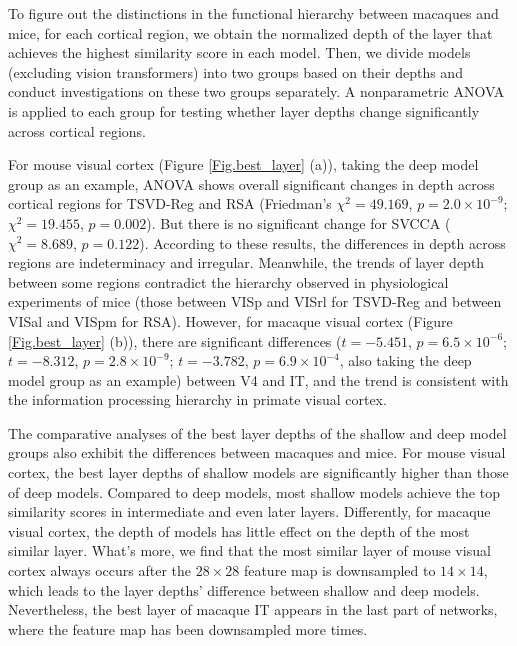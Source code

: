 \documentclass[letterpaper]{article} %
\begin{document}
To figure out the distinctions in the functional hierarchy between macaques and mice, for each cortical region, we obtain the normalized depth of the layer that achieves the highest similarity score in each model. Then, we divide models (excluding vision transformers) into two groups based on their depths and conduct investigations on these two groups separately. A nonparametric ANOVA is applied to each group for testing whether layer depths change significantly across cortical regions.

For mouse visual cortex (Figure \ref{Fig.best_layer} (a)), taking the deep model group as an example, ANOVA shows overall significant changes in depth across cortical regions for TSVD-Reg and RSA (Friedman's ${\chi}^2=49.169$, $p=2.0 \times 10^{-9}$; ${\chi}^2=19.455$, $p=0.002$). But there is no significant change for SVCCA (${\chi}^2=8.689$, $p=0.122$). According to these results, the differences in depth across regions are indeterminacy and irregular. Meanwhile, the trends of layer depth between some regions contradict the hierarchy observed in physiological experiments of mice (those between VISp and VISrl for TSVD-Reg and between VISal and VISpm for RSA). However, for macaque visual cortex (Figure \ref{Fig.best_layer} (b)), there are significant differences ($t=-5.451$, $p=6.5 \times 10^{-6}$; $t=-8.312$, $p=2.8 \times 10^{-9}$; $t=-3.782$, $p=6.9 \times 10^{-4}$, also taking the deep model group as an example) between V4 and IT, and the trend is consistent with the information processing hierarchy in primate visual cortex.

The comparative analyses of the best layer depths of the shallow and deep model groups also exhibit the differences between macaques and mice. For mouse visual cortex, the best layer depths of shallow models are significantly higher than those of deep models. Compared to deep models, most shallow models achieve the top similarity scores in intermediate and even later layers. Differently, for macaque visual cortex, the depth of models has little effect on the depth of the most similar layer. What's more, we find that the most similar layer of mouse visual cortex always occurs after the $28 \times 28$ feature map is downsampled to $14 \times 14$, which leads to the layer depths' difference between shallow and deep models. Nevertheless, the best layer of macaque IT appears in the last part of networks, where the feature map has been downsampled more times.
\end{document}
